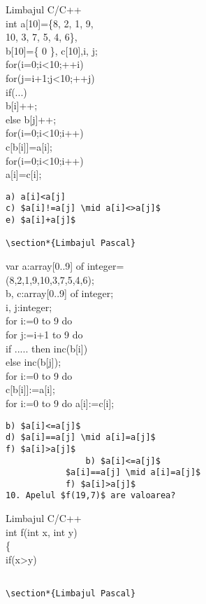 Limbajul C/C++\\[0pt]
int a[10]=\{8, 2, 1, 9,\\
10, 3, 7, 5, 4, 6\},\\[0pt]
b[10]=\{ 0 \}, c[10],i, j;\\
for(i=0;i<10;++i)\\
for(j=i+1;j<10;++j)\\
if(...)\\[0pt]
b[i]++;\\[0pt]
else b[j]++;\\
for(i=0;i<10;i++)\\[0pt]
c[b[i]]=a[i];\\
for(i=0;i<10;i++)\\[0pt]
a[i]=c[i];

\begin{verbatim}
a) a[i]<a[j]
c) $a[i]!=a[j] \mid a[i]<>a[j]$
e) $a[i]+a[j]$

\section*{Limbajul Pascal}
\end{verbatim}

var a:array[0..9] of integer=\\
(8,2,1,9,10,3,7,5,4,6);\\[0pt]
b, c:array[0..9] of integer;\\
i, j:integer;\\
for i:=0 to 9 do\\
for j:=i+1 to 9 do\\[0pt]
if ..... then inc(b[i])\\[0pt]
else inc(b[j]);\\
for i:=0 to 9 do\\[0pt]
c[b[i]]:=a[i];\\[0pt]
for i:=0 to 9 do a[i]:=c[i];

\begin{verbatim}
b) $a[i]<=a[j]$
d) $a[i]==a[j] \mid a[i]=a[j]$
f) $a[i]>a[j]$
                b) $a[i]<=a[j]$
            $a[i]==a[j] \mid a[i]=a[j]$
            f) $a[i]>a[j]$
10. Apelul $f(19,7)$ are valoarea?
\end{verbatim}

Limbajul C/C++\\
int f(int x, int y)\\
\{\\
if(x>y)

\begin{verbatim}

\section*{Limbajul Pascal}
\end{verbatim}

